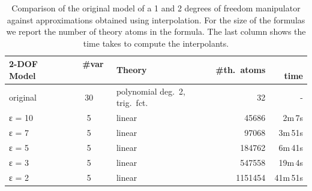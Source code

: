 \begin{example}
\begin{table}
\vspace{2ex}

\begin{tabular}{l|clrr}
2-DOF Model    & ~ \#var  ~~ & Theory   & \#th.~atoms & ~~ time \\
\hline
\hline
original & 30 & polynomial deg.~2, trig.~fct.   & 32        & - \\
\hline
ε = 10   & 5  & linear                          & 45686     & 2m\,7s \\
ε = 7    & 5  & linear                          & 97068     & 3m\,51s  \\
ε = 5    & 5  & linear                          & 184762    & 6m\,41s  \\
ε = 3    & 5  & linear                          & 547558    & 19m\,4s  \\
ε = 2    & 5  & linear                          & 1151454   & 41m\,51s  \\
\end{tabular}

\vspace{1ex}

\caption{
    Comparison of the original model of a 1 and 2 degrees of freedom manipulator against approximations obtained using interpolation.
    For the size of the formulas we report the number of theory atoms in the formula.
    The last column shows the time \dReal takes to compute the interpolants.
}
\label{tbl:robot}
\end{table}


\end{example}





